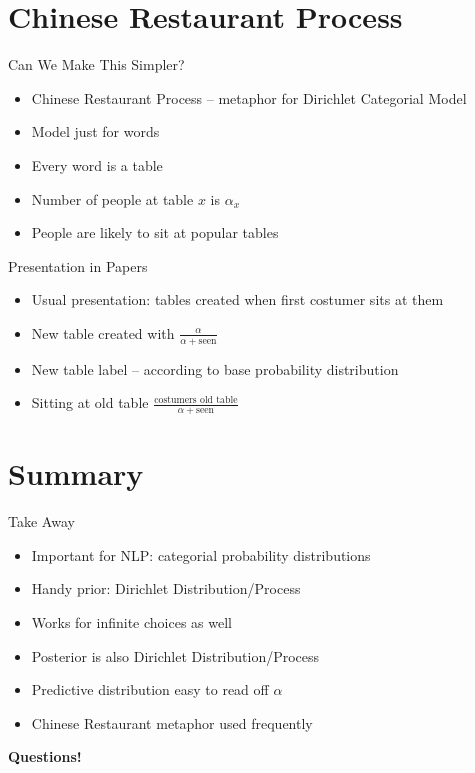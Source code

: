 \documentclass[11pt]{beamer}
\begin{document}
	\section{Chinese Restaurant Process}
	
	\begin{frame}{Can We Make This Simpler?}
		\begin{itemize}
			\item Chinese Restaurant Process -- metaphor for Dirichlet Categorial Model
			\item Model just for words
			\item Every word is a table
			\item Number of people at table $x$ is $\alpha_x$
			\item People are likely to sit at popular tables
		\end{itemize}
	\end{frame}
	
	\begin{frame}{Presentation in Papers}
		\begin{itemize}
			\item Usual presentation: tables created when first costumer sits at them
			\item New table created with $\frac{\alpha}{\alpha+\text{seen}}$
			\item New table label -- according to base probability distribution
			\item  Sitting at old table $\frac{\text{costumers old table}}{\alpha+\text{seen}}$
		\end{itemize}
	\end{frame}
	
	\section{Summary}
	
	\begin{frame}{Take Away}
		\begin{itemize}
			\item Important for NLP: categorial probability distributions
			\item Handy prior: Dirichlet Distribution/Process
			\item Works for infinite choices as well
			\item Posterior is also Dirichlet Distribution/Process
			\item Predictive distribution easy to read off $\alpha$
			\item Chinese Restaurant metaphor used frequently
		\end{itemize}
	\end{frame}
	
	\begin{frame}
		\centering
		\begin{Large}
			\textbf{Questions!}
		\end{Large}
	\end{frame}
	
\end{document}
